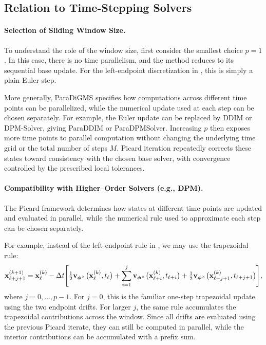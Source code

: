 \subsection{Relation to Time-Stepping Solvers}

\paragraph{Selection of Sliding Window Size.}
To understand the role of the window size, first consider the smallest
choice $p=1$. In this case, there is no time parallelism, and the method
reduces to its sequential base update. For the left-endpoint discretization
in , this is simply a plain Euler step.

More generally, ParaDiGMS specifies how computations across different time
points can be parallelized, while the numerical update used at each step can
be chosen separately. For example, the Euler update can be replaced by DDIM
or DPM-Solver, giving ParaDDIM or ParaDPMSolver. Increasing $p$ then exposes
more time points to parallel computation without changing the underlying time
grid or the total number of steps $M$. Picard iteration repeatedly corrects
these states toward consistency with the chosen base solver, with convergence
controlled by the prescribed local tolerances.

\paragraph{Compatibility with Higher--Order Solvers (e.g., DPM).}
The Picard framework determines how states at different time points are updated
and evaluated in parallel, while the numerical rule used to approximate each
step can be chosen separately.

For example, instead of the left-endpoint rule in
, we may use the trapezoidal rule:
\begin{align*}
{\mathbf{x}}^{(k+1)}_{\ell+j+1}
=
{\mathbf{x}}^{(k)}_{\ell}
-\Delta t\Bigg[
\tfrac{1}{2}
{\mathbf{v}}_{{\bm{\phi}}^\times}
\big({\mathbf{x}}^{(k)}_{\ell},t_{\ell}\big)
+
\sum_{i=1}^{j}
{\mathbf{v}}_{{\bm{\phi}}^\times}
\big({\mathbf{x}}^{(k)}_{\ell+i},t_{\ell+i}\big)
+
\tfrac{1}{2}
{\mathbf{v}}_{{\bm{\phi}}^\times}
\big({\mathbf{x}}^{(k)}_{\ell+j+1},t_{\ell+j+1}\big)
\Bigg],
\end{align*}
where $j=0,\ldots,p-1$. For $j=0$, this is the familiar one-step trapezoidal update using the two
endpoint drifts. For larger $j$, the same rule accumulates the trapezoidal
contributions across the window. Since all drifts are evaluated using the
previous Picard iterate, they can still be computed in parallel, while the
interior contributions can be accumulated with a prefix sum.

